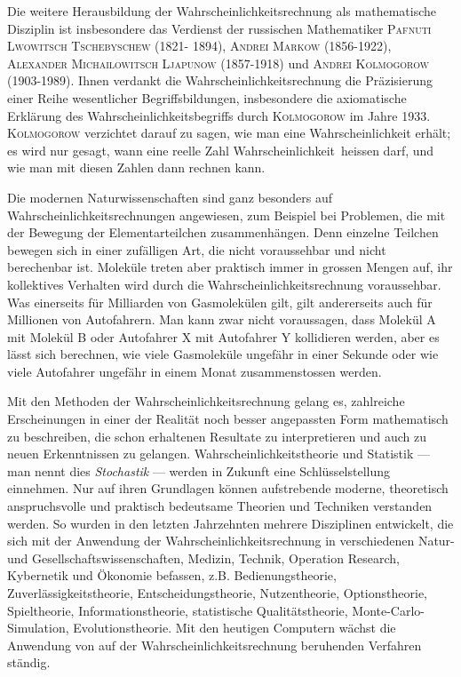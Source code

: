 \documentclass[%
11pt,%
twoside,%
titlepage,%
german,%
headsepline%
]{scrartcl}
\newcounter{theo}[section]\setcounter{theo}{0}
\begin{document}
Die weitere Herausbildung der Wahrscheinlichkeitsrechnung als mathematische Disziplin ist insbesondere das Verdienst der russischen Mathematiker \textsc{Pafnuti Lwowitsch Tschebyschew} (1821- 1894), \textsc{Andrei Markow} (1856-1922), \textsc{Alexander Michailowitsch Ljapunow} (1857-1918) und \textsc{Andrei Kolmogorow} (1903-1989). Ihnen verdankt die Wahrscheinlichkeitsrechnung die Präzisierung einer Reihe wesentlicher Begriffsbildungen, insbesondere die axiomatische Erklärung des Wahrscheinlichkeitsbegriffs durch \textsc{Kolmogorow} im Jahre 1933. \textsc{Kolmogorow} verzichtet darauf zu sagen, wie man eine Wahrscheinlichkeit erhält; es wird nur gesagt, wann eine reelle Zahl \glqq Wahrscheinlichkeit\grqq\ heissen darf, und wie man mit diesen Zahlen dann rechnen kann.

Die modernen Naturwissenschaften sind ganz besonders auf Wahrscheinlichkeitsrechnungen angewiesen, zum Beispiel bei Problemen, die mit der Bewegung der Elementarteilchen zusammenhängen. Denn einzelne Teilchen bewegen sich in einer zufälligen Art, die nicht voraussehbar und nicht berechenbar ist. Moleküle treten aber praktisch immer in grossen Mengen auf, ihr kollektives Verhalten wird durch die Wahrscheinlichkeitsrechnung voraussehbar. Was einerseits für Milliarden von Gasmolekülen gilt, gilt andererseits auch für Millionen von Autofahrern. Man kann zwar nicht voraussagen, dass Molekül A mit Molekül B oder Autofahrer X mit Autofahrer Y kollidieren werden, aber es lässt sich berechnen, wie viele Gasmoleküle ungefähr in einer Sekunde oder wie viele Autofahrer ungefähr in einem Monat zusammenstossen werden.

Mit den Methoden der Wahrscheinlichkeitsrechnung gelang es, zahlreiche Erscheinungen in einer der Realität noch besser angepassten Form mathematisch zu beschreiben, die schon erhaltenen Resultate zu interpretieren und auch zu neuen Erkenntnissen zu gelangen. Wahrscheinlichkeitstheorie und Statistik --- man nennt dies \emph{Stochastik} --- werden in Zukunft eine Schlüsselstellung einnehmen. Nur auf ihren Grundlagen können aufstrebende moderne, theoretisch anspruchsvolle und praktisch bedeutsame Theorien und Techniken verstanden werden. So wurden in den letzten Jahrzehnten mehrere Disziplinen entwickelt, die sich mit der Anwendung der Wahrscheinlichkeitsrechnung in verschiedenen Natur- und Gesellschaftswissenschaften, Medizin, Technik, Operation Research, Kybernetik und Ökonomie befassen, z.B. Bedienungstheorie, Zuverlässigkeitstheorie, Entscheidungstheorie, Nutzentheorie, Optionstheorie, Spieltheorie, Informationstheorie, statistische Qualitätstheorie, Monte-Carlo-Simulation, Evolutionstheorie. Mit den heutigen Computern wächst die Anwendung von auf der Wahrscheinlichkeitsrechnung beruhenden Verfahren ständig.
\end{document}

